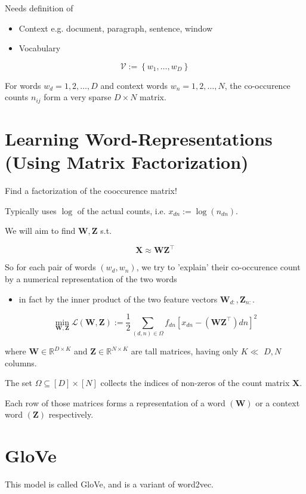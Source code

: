 \documentclass[10pt]{article}
\begin{document}
Needs definition of

\begin{itemize}
  \item Context e.g. document, paragraph, sentence, window
  \item Vocabulary
\end{itemize}

$$
\mathcal{V}:=\left\{w_{1}, \ldots, w_{D}\right\}
$$

For words $w_{d}=1,2, \ldots, D$ and context words $w_{n}=1,2, \ldots, N$, the co-occurence counts $n_{i j}$ form a very sparse $D \times N$ matrix.

\section*{Learning Word-Representations (Using Matrix Factorization)}
Find a factorization of the cooccurence matrix!

Typically uses $\log$ of the actual counts, i.e. $x_{d n}:=\log \left(n_{d n}\right)$.

We will aim to find $\mathbf{W}, \mathbf{Z}$ s.t.

$$
\mathbf{X} \approx \mathbf{W} \mathbf{Z}^{\top}
$$

So for each pair of words $\left(w_{d}, w_{n}\right)$, we try to 'explain' their co-occurence count by a numerical representation of the two words

\begin{itemize}
  \item in fact by the inner product of the two feature vectors $\mathbf{W}_{d:}, \mathbf{Z}_{n:}$.
\end{itemize}

$$
\min _{\mathbf{W}, \mathbf{Z}} \mathcal{L}(\mathbf{W}, \mathbf{Z}):=\frac{1}{2} \sum_{(d, n) \in \Omega} f_{d n}\left[x_{d n}-\left(\mathbf{W} \mathbf{Z}^{\top}\right) d n\right]^{2}
$$

where $\mathbf{W} \in \mathbb{R}^{D \times K}$ and $\mathbf{Z} \in \mathbb{R}^{N \times K}$ are tall matrices, having only $K \ll$ $D, N$ columns.

The set $\Omega \subseteq[D] \times[N]$ collects the indices of non-zeros of the count matrix $\mathbf{X}$.

Each row of those matrices forms a representation of a word $(\mathbf{W})$ or a context word $(\mathbf{Z})$ respectively.

\section*{GloVe}
This model is called GloVe, and is a variant of word2vec.
\end{document}
